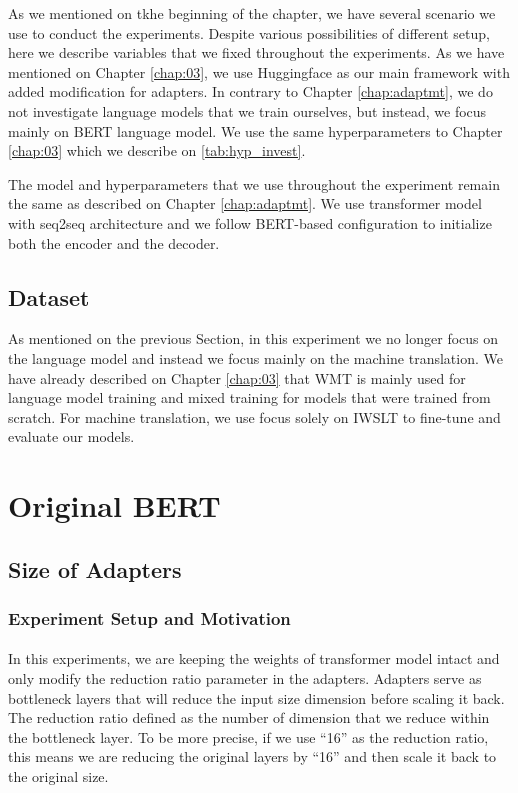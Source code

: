 As we mentioned on tkhe beginning of the chapter, we have several scenario we use to conduct the experiments. Despite various possibilities of different setup, here we describe variables that we fixed throughout the experiments. As we have mentioned on Chapter \ref{chap:03}, we use Huggingface as our main framework with added modification for adapters. In contrary to Chapter \ref{chap:adaptmt}, we do not investigate language models that we train ourselves, but instead, we focus mainly on BERT language model. We use the same hyperparameters to Chapter \ref{chap:03} which we describe on \cref{tab:hyp_invest}.

The model and hyperparameters that we use throughout the experiment remain the same as described on Chapter \ref{chap:adaptmt}. We use transformer model with seq2seq architecture and we follow BERT-based configuration to initialize both the encoder and the decoder.


\subsection{Dataset}
As mentioned on the previous Section, in this experiment we no longer focus on the language model and instead we focus mainly on the machine translation. We have already described on Chapter \ref{chap:03} that WMT is mainly used for language model training and mixed training for models that were trained from scratch. For machine translation, we use focus solely on IWSLT to fine-tune and evaluate our models.


\section{Original BERT}
\subsection{Size of Adapters}
\subsubsection{Experiment Setup and Motivation}
\paragraph{}
In this experiments, we are keeping the weights of transformer model intact and only modify the reduction ratio parameter in the adapters. Adapters serve as bottleneck layers that will reduce the input size dimension before scaling it back. The reduction ratio defined as the number of dimension that we reduce within the bottleneck layer. To be more precise, if we use ``16'' as the reduction ratio, this means we are reducing the original layers by ``16'' and then scale it back to the original size.

